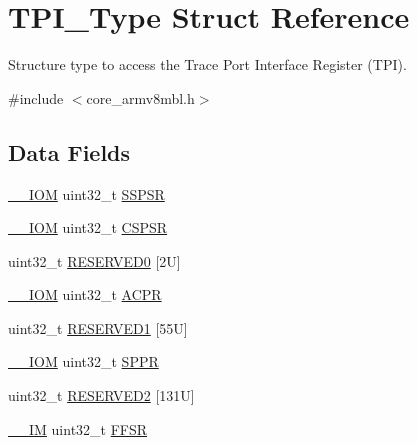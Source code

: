 \hypertarget{struct_t_p_i___type}{}\section{T\+P\+I\+\_\+\+Type Struct Reference}
\label{struct_t_p_i___type}


Structure type to access the Trace Port Interface Register (T\+PI).  




{\ttfamily \#include $<$core\+\_\+armv8mbl.\+h$>$}

\subsection*{Data Fields}
\begin{DoxyCompactItemize}
\item 
\mbox{\hyperlink{core__cm4_8h_ab6caba5853a60a17e8e04499b52bf691}{\+\_\+\+\_\+\+I\+OM}} uint32\+\_\+t \mbox{\hyperlink{struct_t_p_i___type_a1aa8bba158b6ac122676301f17a362d9}{S\+S\+P\+SR}}
\item 
\mbox{\hyperlink{core__cm4_8h_ab6caba5853a60a17e8e04499b52bf691}{\+\_\+\+\_\+\+I\+OM}} uint32\+\_\+t \mbox{\hyperlink{struct_t_p_i___type_abf4a378b17278d98d2a5f9315fce7a5e}{C\+S\+P\+SR}}
\item 
uint32\+\_\+t \mbox{\hyperlink{struct_t_p_i___type_aa57754b8f88bb376d184aaf6fe74f391}{R\+E\+S\+E\+R\+V\+E\+D0}} \mbox{[}2\+U\mbox{]}
\item 
\mbox{\hyperlink{core__cm4_8h_ab6caba5853a60a17e8e04499b52bf691}{\+\_\+\+\_\+\+I\+OM}} uint32\+\_\+t \mbox{\hyperlink{struct_t_p_i___type_a49a770cf0b7ec970f919f8ac22634fff}{A\+C\+PR}}
\item 
uint32\+\_\+t \mbox{\hyperlink{struct_t_p_i___type_a4d91e8d0f8791a2d137be359e6ca669f}{R\+E\+S\+E\+R\+V\+E\+D1}} \mbox{[}55\+U\mbox{]}
\item 
\mbox{\hyperlink{core__cm4_8h_ab6caba5853a60a17e8e04499b52bf691}{\+\_\+\+\_\+\+I\+OM}} uint32\+\_\+t \mbox{\hyperlink{struct_t_p_i___type_ae9673e1acb75a46ed9852fd7a557cb7d}{S\+P\+PR}}
\item 
uint32\+\_\+t \mbox{\hyperlink{struct_t_p_i___type_ad34dc93fd7d41ef2c3365292cc8a178d}{R\+E\+S\+E\+R\+V\+E\+D2}} \mbox{[}131\+U\mbox{]}
\item 
\mbox{\hyperlink{core__cm4_8h_a4cc1649793116d7c2d8afce7a4ffce43}{\+\_\+\+\_\+\+IM}} uint32\+\_\+t \mbox{\hyperlink{struct_t_p_i___type_a2a049b49e9da6772d38166397ce8fc70}{F\+F\+SR}}
\item 

\end{DoxyCompactItemize}
